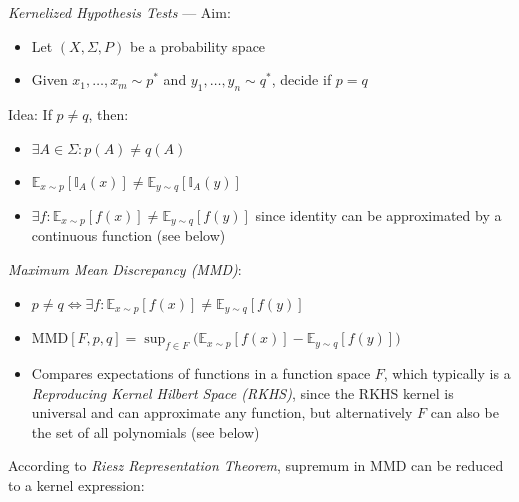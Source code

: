 \emph{Kernelized Hypothesis Tests} ---
Aim:
\begin{itemize}
    \item Let $(X, \Sigma, P)$ be a probability space
    \item Given $x_1, \ldots, x_m \sim p^*$ and $y_1, \ldots, y_n \sim q^*$, decide if $p = q$
\end{itemize}
Idea: If $p \neq q$, then:
\begin{itemize}
    \item $\exists A \in \Sigma: p(A) \neq q(A)$
    \item $\mathbb{E}_{x \sim p}[\mathbb{I}_A(x)] \neq \mathbb{E}_{y \sim q}[\mathbb{I}_A(y)]$
    \item $\exists f: \mathbb{E}_{x \sim p}[f(x)] \neq \mathbb{E}_{y \sim q}[f(y)]$ since identity can be approximated by a continuous function (see below)
\end{itemize}
\emph{Maximum Mean Discrepancy (MMD)}:
\begin{itemize}
    \item $p \neq q \iff \exists f: \mathbb{E}_{x \sim p}[f(x)] \neq \mathbb{E}_{y \sim q}[f(y)]$
    \item $\text{MMD}[F, p, q] = \sup_{f \in F} \Big(\mathbb{E}_{x \sim p}[f(x)] - \mathbb{E}_{y \sim q}[f(y)]\Big)$
    \item Compares expectations of functions in a function space $F$, which typically is a \emph{Reproducing Kernel Hilbert Space (RKHS)}, since the RKHS kernel is universal and can approximate any function, but alternatively $F$ can also be the set of all polynomials (see below)
\end{itemize}
According to \emph{Riesz Representation Theorem}, supremum in MMD can be reduced to a kernel expression:

